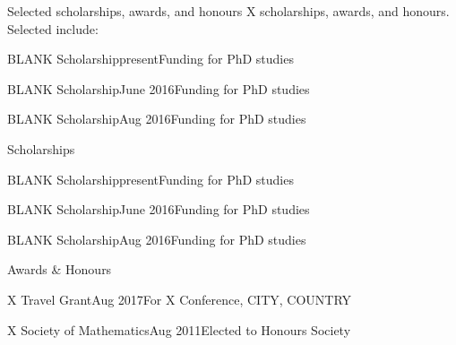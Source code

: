 \documentclass{resume} %
\begin{document}
\ifresume %
    \begin{rSection}{Selected scholarships, awards, and honours}
    \vspace{-0.3em} X scholarships, awards, and honours. Selected include:
    
    \begin{rEntry}{BLANK Scholarship}{present}{Funding for PhD studies}\end{rEntry}
    
    \begin{rEntry}{BLANK Scholarship}{June 2016}{Funding for PhD studies}\end{rEntry}
        
    \begin{rEntry}{BLANK Scholarship}{Aug 2016}{Funding for PhD studies}\end{rEntry}

    \end{rSection}
\else %
    \begin{rSection}{Scholarships}

    \begin{rEntry}{BLANK Scholarship}{present}{Funding for PhD studies}\end{rEntry}
    
    \begin{rEntry}{BLANK Scholarship}{June 2016}{Funding for PhD studies}\end{rEntry}
        
    \begin{rEntry}{BLANK Scholarship}{Aug 2016}{Funding for PhD studies}\end{rEntry}

    \end{rSection}
    
    \begin{rSection}{Awards \& Honours}
    
    \begin{rEntry}{X Travel Grant}{Aug 2017}{For X Conference, CITY, COUNTRY}\end{rEntry}
    
    \begin{rEntry}{X Society of Mathematics}{Aug 2011}{Elected to Honours Society}\end{rEntry}
    
    \end{rSection}
\fi %
\end{document}
